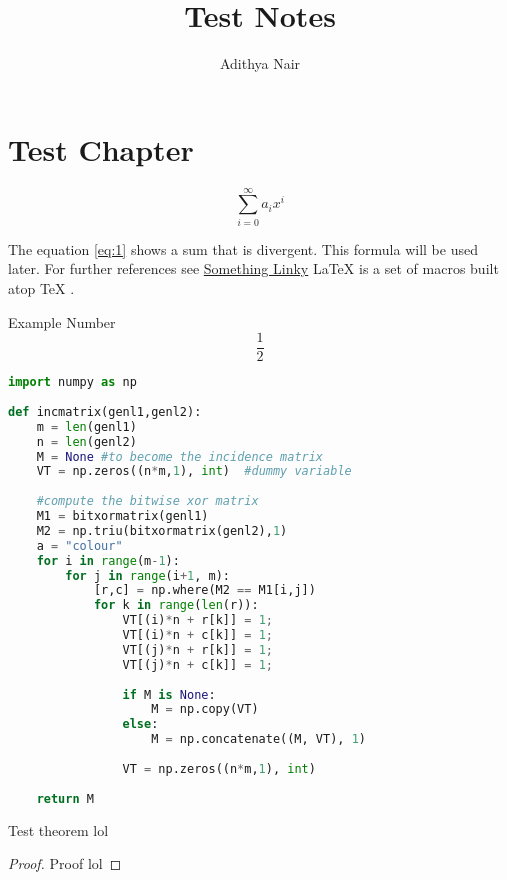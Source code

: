 \documentclass[twoside]{report}
\title{Test Notes}
\author{Adithya Nair}
\begin{document}
\chapter{Test Chapter}
\begin{equation}
\label{eq:1}
\sum_{i=0}^{\infty} a_i x^i
\end{equation}

The equation \ref{eq:1} shows a sum that is divergent. This formula will be used later.
For further references see \href{http://www.overleaf.com}{Something Linky}
\LaTeX{} \cite{latex2e} is a set of macros built atop \TeX{} \cite{texbook}.

\begin{example}
	Example Number
	\[\frac{1}{2}\]
\end{example}
\begin{lstlisting}[language=Python, caption=Python example]
import numpy as np
    
def incmatrix(genl1,genl2):
    m = len(genl1)
    n = len(genl2)
    M = None #to become the incidence matrix
    VT = np.zeros((n*m,1), int)  #dummy variable
    
    #compute the bitwise xor matrix
    M1 = bitxormatrix(genl1)
    M2 = np.triu(bitxormatrix(genl2),1) 
    a = "colour"
    for i in range(m-1):
        for j in range(i+1, m):
            [r,c] = np.where(M2 == M1[i,j])
            for k in range(len(r)):
                VT[(i)*n + r[k]] = 1;
                VT[(i)*n + c[k]] = 1;
                VT[(j)*n + r[k]] = 1;
                VT[(j)*n + c[k]] = 1;
                
                if M is None:
                    M = np.copy(VT)
                else:
                    M = np.concatenate((M, VT), 1)
                
                VT = np.zeros((n*m,1), int)
    
    return M
\end{lstlisting}

\begin{theorem}
	Test theorem lol
\end{theorem}
\begin{proof}
	Proof lol
\end{proof}



\end{document}
